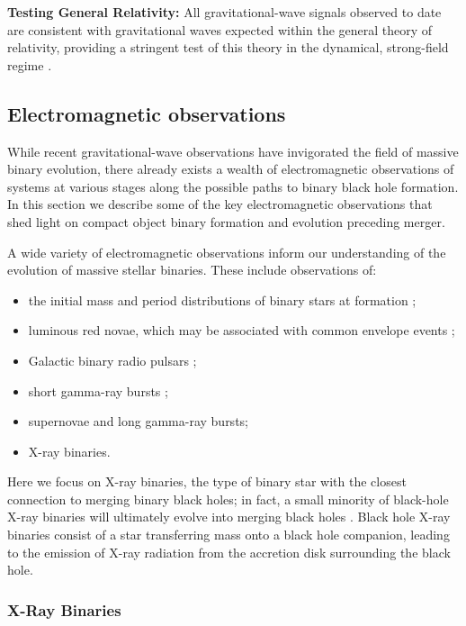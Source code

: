 \documentclass[iop,onecolumn]{revtex4}
\begin{document}
\textbf{Testing General Relativity:} All gravitational-wave signals observed to date are consistent with gravitational waves expected within the general theory of relativity, providing a stringent test of this theory in the dynamical, strong-field regime \citep{GW150914:GR}.

\subsection{Electromagnetic observations}

While recent gravitational-wave observations have invigorated the field of massive binary evolution, there already exists a wealth of electromagnetic observations of systems at various stages along the possible paths to binary black hole formation. In this section we describe some of the key electromagnetic observations that shed light on compact object binary formation and evolution preceding merger.

A wide variety of electromagnetic observations inform our understanding of the evolution of massive stellar binaries. These include observations of: 
\begin{itemize}
\item the initial mass and period distributions of binary stars at formation \citep[e.g.,][]{Sana:2012}; 
\item luminous red novae, which may be associated with common envelope events \citep[e.g.,][]{Ivanova:2013LRN};
\item Galactic binary radio pulsars \citep[e.g.,][]{Tauris:2017};
\item short gamma-ray bursts \citep[e.g..][]{Berger:2014};
\item supernovae and long gamma-ray bursts;
\item X-ray binaries.
\end{itemize}
Here we focus on X-ray binaries, the type of binary star with the closest connection to merging binary black holes; in fact, a small minority of black-hole X-ray binaries will ultimately evolve into merging black holes \citep{CygnusX3:2012}. Black hole X-ray binaries consist of a star transferring mass onto a black hole companion, leading to the emission of X-ray radiation from the accretion disk surrounding the black hole. 

\subsubsection{X-Ray Binaries}
\end{document}
